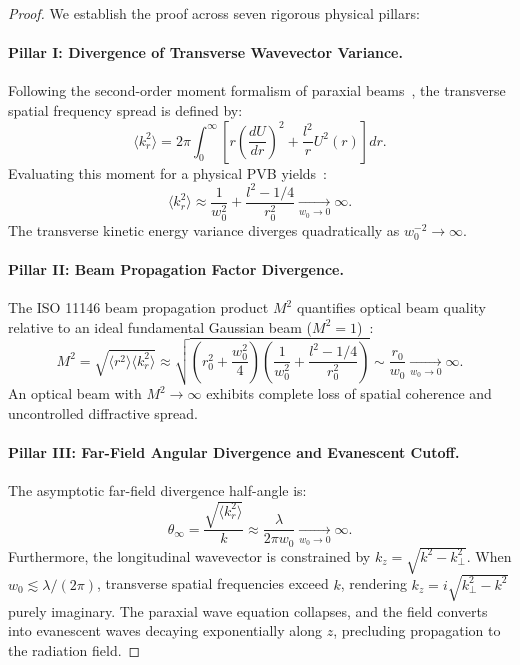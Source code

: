 \documentclass[11pt,a4paper]{article}
\begin{document}
\begin{proof}
We establish the proof across seven rigorous physical pillars:

\paragraph{Pillar I: Divergence of Transverse Wavevector Variance.}
Following the second-order moment formalism of paraxial beams~\cite{Ferreira2026}, the transverse spatial frequency spread is defined by:
\begin{equation}
\langle k_r^2 \rangle = 2\pi \int_0^\infty \left[ r \left( \frac{dU}{dr} \right)^2 + \frac{l^2}{r} U^2(r) \right] dr.
\end{equation}
Evaluating this moment for a physical PVB yields~\cite{Ferreira2026}:
\begin{equation}
\langle k_r^2 \rangle \approx \frac{1}{w_0^2} + \frac{l^2 - 1/4}{r_0^2} \xrightarrow[w_0 \to 0]{} \infty.
\end{equation}
The transverse kinetic energy variance diverges quadratically as $w_0^{-2} \to \infty$.

\paragraph{Pillar II: Beam Propagation Factor Divergence.}
The ISO 11146 beam propagation product $M^2$ quantifies optical beam quality relative to an ideal fundamental Gaussian beam ($M^2 = 1$)~\cite{ISO11146,Siegman1986}:
\begin{equation}
M^2 = \sqrt{\langle r^2 \rangle \langle k_r^2 \rangle} \approx \sqrt{\left( r_0^2 + \frac{w_0^2}{4} \right) \left( \frac{1}{w_0^2} + \frac{l^2 - 1/4}{r_0^2} \right)} \sim \frac{r_0}{w_0} \xrightarrow[w_0 \to 0]{} \infty.
\end{equation}
An optical beam with $M^2 \to \infty$ exhibits complete loss of spatial coherence and uncontrolled diffractive spread.

\paragraph{Pillar III: Far-Field Angular Divergence and Evanescent Cutoff.}
The asymptotic far-field divergence half-angle is:
\begin{equation}
\theta_\infty = \frac{\sqrt{\langle k_r^2 \rangle}}{k} \approx \frac{\lambda}{2\pi w_0} \xrightarrow[w_0 \to 0]{} \infty.
\end{equation}
Furthermore, the longitudinal wavevector is constrained by $k_z = \sqrt{k^2 - k_\perp^2}$. When $w_0 \lesssim \lambda / (2\pi)$, transverse spatial frequencies exceed $k$, rendering $k_z = i \sqrt{k_\perp^2 - k^2}$ purely imaginary. The paraxial wave equation collapses, and the field converts into evanescent waves decaying exponentially along $z$, precluding propagation to the radiation field.


\end{proof}
\end{document}
